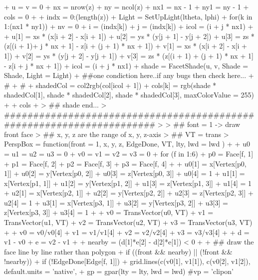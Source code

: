 \documentclass[paper=a4, fontsize=11pt]{report}
\begin{document}
\begin{Schunk}
\begin{Sinput}
{+     u = v = 0
+     nx = nrow(z)
+     ny = ncol(z)
+     nx1 = nx - 1
+     ny1 = ny - 1
+     cols = 0
+     
+     indx = 0:(length(z))
+     Light = SetUpLight(ltheta, lphi)
+     for(k in 1:(nx1 * ny1)){
+         nv = 0
+         i = (indx[k]) %
+         j = (indx[k]) %
+         icol = (i + j * nx1) %
+ 
+         u[1] = xs * (x[i + 2] - x[i + 1])
+ 	    u[2] = ys * (y[j + 1] - y[j + 2])
+ 	    u[3] = zs * (z[(i + 1)+ j * nx + 1] - z[i + (j + 1) * nx + 1])
+ 	    v[1] = xs * (x[i + 2] - x[i + 1])
+ 	    v[2] = ys * (y[j + 2] - y[j + 1])
+ 	    v[3] = zs * (z[(i + 1) + (j + 1) * nx + 1] - z[i + j * nx + 1])
+         icol = (i + j * nx1) %
+ 	    shade = FacetShade(u, v, Shade = Shade, Light = Light)
+         ##one condiction here..if any bugs then check here...
+         #
+         #
+         shadedCol = col2rgb(col[icol + 1])
+         cols[k] = rgb(shade * shadedCol[1], shade * shadedCol[2], shade * shadedCol[3], maxColorValue = 255)
+     }
+         cols
+ }
> ## shade end...
> #####################################################################
> 
> ## font = 1 -> draw front face
> ## x, y, z are the range of x, y, z-axis
> ## VT = trans
> PerspBox = function(front = 1, x, y, z, EdgeDone, VT, lty, lwd = lwd )
+ {
+     u0 = u1 = u2 = u3 = 0
+     v0 = v1 = v2 = v3 = 0
+     for (f in 1:6) {
+         p0 = Face[f, 1]
+         p1 = Face[f, 2]
+         p2 = Face[f, 3]
+         p3 = Face[f, 4]
+ 
+         u0[1] = x[Vertex[p0, 1]]
+         u0[2] = y[Vertex[p0, 2]]
+         u0[3] = z[Vertex[p0, 3]]
+         u0[4] = 1
+         u1[1] = x[Vertex[p1, 1]]
+         u1[2] = y[Vertex[p1, 2]]
+         u1[3] = z[Vertex[p1, 3]]
+         u1[4] = 1
+         u2[1] = x[Vertex[p2, 1]]
+         u2[2] = y[Vertex[p2, 2]]
+         u2[3] = z[Vertex[p2, 3]]
+         u2[4] = 1
+         u3[1] = x[Vertex[p3, 1]]
+         u3[2] = y[Vertex[p3, 2]]
+         u3[3] = z[Vertex[p3, 3]]
+         u3[4] = 1
+ 
+         v0 = TransVector(u0, VT)
+         v1 = TransVector(u1, VT)
+         v2 = TransVector(u2, VT)
+         v3 = TransVector(u3, VT)
+         
+         v0 = v0/v0[4]
+         v1 = v1/v1[4]
+         v2 = v2/v2[4]
+         v3 = v3/v3[4]
+         
+         d = v1 - v0
+         e = v2 - v1
+         
+         nearby = (d[1]*e[2] - d[2]*e[1]) < 0
+         
+         ## draw the face line by line rather than polygon
+         if ((front && nearby) || (!front && !nearby)) {
+             if (!EdgeDone[Edge[f, 1]]){
+                 grid.lines(c(v0[1], v1[1]), c(v0[2], v1[2]), default.units = 'native',
+                     gp = gpar(lty = lty, lwd = lwd) #vp = 'clipon'
}}}}
\end{Sinput}
\end{Schunk}
\end{document}
